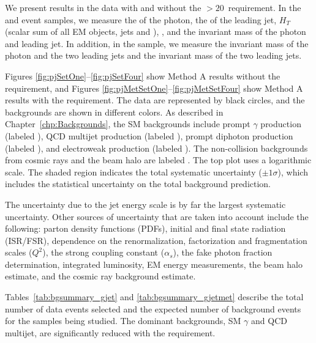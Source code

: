 \vspace{0.015\textheight}
We present results in the \phojets data with and without the \met$>20$~\etUnits requirement. In the \phoonejet and \photwojet event samples, we measure the \et of the photon, the \et of the leading jet, $H_{T}$ (scalar sum of all EM objects, jets and \met), \met, and the invariant mass of the photon and leading jet. In addition, in the \photwojet sample, we measure the invariant mass of the photon and the two leading jets and the invariant mass of the two leading jets.

Figures \ref{fig:pjSetOne}--\ref{fig:pjSetFour} show Method A results without the \met requirement, and Figures \ref{fig:pjMetSetOne}--\ref{fig:pjMetSetFour} show Method A results with the \met requirement. The data are represented by black circles, and the backgrounds are shown in different colors. As described in Chapter~\ref{chp:Backgrounds}, the SM backgrounds include prompt $\gamma$ production (labeled ), QCD multijet production (labeled ), prompt diphoton production (labeled ), and electroweak production (labeled ). The non-collision backgrounds from cosmic rays and the beam halo are labeled . The top plot uses a logarithmic scale. The shaded region indicates the total systematic uncertainty ($\pm1\sigma$), which includes the statistical uncertainty on the total background prediction.

The uncertainty due to the jet energy scale is by far the largest systematic uncertainty. Other sources of uncertainty that are taken into account include the following: parton density functions (PDFs), initial and final state radiation (ISR/FSR), dependence on the renormalization, factorization and fragmentation scales ($Q^{2}$), the strong coupling constant ($\alpha_{s}$), the fake photon fraction determination, integrated luminosity, EM energy measurements, the beam halo estimate, and the cosmic ray background estimate.

Tables~\ref{tab:bgsummary_gjet} and \ref{tab:bgsummary_gjetmet} describe the total number of data events selected and the expected number of background events for the samples being studied. The dominant backgrounds, SM $\gamma$ and QCD multijet, are significantly reduced with the \met requirement.

